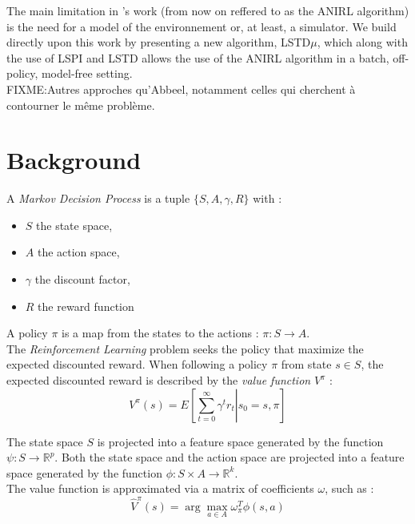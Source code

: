 \documentclass{article}
\begin{document}
The main limitation in \citet{abbeel2004apprenticeship}'s work (from now on reffered to as the ANIRL algorithm) is the need for a model of the environnement or, at least, a simulator. We build directly upon this work by presenting a new algorithm, LSTD$\mu$, which along with the use of LSPI and LSTD allows the use of the ANIRL algorithm in a batch, off-policy, model-free setting.\\

FIXME:Autres approches qu'Abbeel, notamment celles qui cherchent à contourner le même problème.\\

\section{Background}
\label{sec:back}
A \emph{Markov Decision Process} is a tuple $\{S,A,\gamma,R\}$ with :
\begin{itemize}
\item $S$ the state space,
\item $A$ the action space,
\item $\gamma$ the discount factor,
\item $R$ the reward function
\end{itemize}

A policy $\pi$ is a map from the states to the actions : $\pi:S\rightarrow A$.\\

The \emph{Reinforcement Learning} problem seeks the policy that maximize the expected discounted reward. When following a policy $\pi$ from state $s\in S$, the expected discounted reward is described by the \emph{value function} $V^\pi$ : \\
\begin{equation}
V^\pi(s) = E\left[\left.\sum\limits_{t=0}^{\infty}\gamma^tr_t\right|s_0=s,\pi\right]
\label{eqn:V}
\end{equation}

The state space $S$ is projected into a feature space generated by the function $\psi : S \rightarrow \mathbb{R}^p$. Both the state space and the action space are projected into a feature space generated by the function $\phi : S\times A \rightarrow \mathbb{R}^k$.\\

The value function is approximated via a matrix of coefficients $\omega$, such as :
\begin{equation}
\hat V^\pi(s) = \arg\max_{a\in A}\omega_\pi^T\phi(s,a)
\end{equation}
\end{document}
